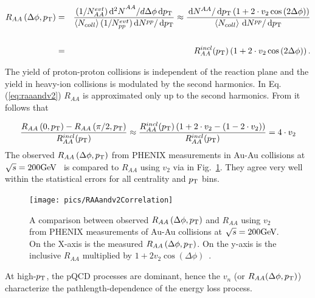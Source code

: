 \begin{eqnarray}
R_{AA}\left(\Delta\phi, p_{\rm T}\right) &=& \frac{(1/N_{AA}^{evt})\,\textrm d{^2N}^{AA}/d\Delta\phi \,\textrm d{p_{\rm T}}}{\left< N_{coll}\right> (1/N_{pp}^{evt})\,\textrm d{N^{pp}}/\,\textrm d{p_{\rm T}}} \approx \frac{\,\textrm d{N^{AA}}/\,\textrm d{p_{\rm T}}\left( 1+2\cdot v_2\cos{(2\Delta\phi)} \right)}{\left< N_{coll}\right> \,\textrm d{N^{pp}}/\,\textrm d{p_{\rm T}}} \nonumber \\ &&\nonumber\\
&=& R_{AA}^{incl}(p_{\rm T}) \left( 1+2\cdot v_2\cos{(2\Delta\phi)} \right).
\label{eq:raaandv2}
\end{eqnarray}	

The yield of proton-proton collisions is independent of the reaction plane and the yield in heavy-ion collisions is modulated by the second harmonics. In Eq. (\ref{eq:raaandv2}) $R_{AA}$ is approximated only up to the second harmonics.
From  it follows that

\begin{equation}
\frac{R_{AA}\left(0, p_{\rm T}\right)-R_{AA}\left(\pi/2, p_{\rm T}\right)}{R_{AA}^{incl}(p_{\rm T})} \approx \frac{R_{AA}^{incl}(p_{\rm T}) \left(1+2 \cdot v_2-(1-2 \cdot v_2) \right)}{R_{AA}^{incl}(p_{\rm T})} = 4 \cdot v_2
\label{eq:raaandv2result}
\end{equation} 
The observed $R_{AA}\left(\Delta\phi, \pt{}\right)$  from PHENIX measurements in Au-Au collisions at $\sqrt{s}=200\mathrm{GeV}\kern-0.05em$~\cite{PhysRevC.80.054907} is compared to $R_{AA}$ using $v_2$  via  in Fig.~\ref{fig:RAAv2}. They agree very well within the statistical errors for all centrality and $p_{\rm T}$ bins.
\begin{figure}[htb]
	\centering
                \texttt{[image: pics/RAAandv2Correlation]}
        \caption[A comparison between observed $R_{AA}\left(\Delta\phi, \pt{}\right) $ and $R_{AA}$ using $v_2$]{ A comparison between observed $R_{AA}\left(\Delta\phi, \pt{}\right) $ and $R_{AA}$ using $v_2$ from PHENIX measurements of Au-Au collisions at $\sqrt{s}=200\mathrm{GeV}\kern-0.05em$. On the X-axis is the measured $R_{AA}\left(\Delta\phi,\pt{}\right)$. On the y-axis is the inclusive $R_{AA}$ multiplied by  $1+2v_2\cos\left(\Delta\phi\right)$~\cite{PhysRevC.80.054907}.}
        \label{fig:RAAv2}
\end{figure}

At high-$p_{\rm T}$, the pQCD processes are dominant, hence the $v_n$ (or $R_{AA}(\Delta\phi, p_{\rm T})$) characterize the pathlength-dependence of the energy loss process.

